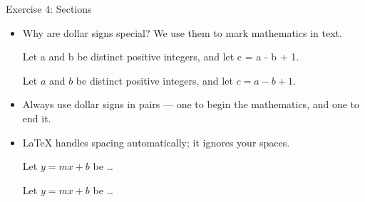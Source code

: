 \documentclass[10pt,times]{beamer}
\begin{document}
\begin{frame}[fragile]{Exercise 4: Sections}
\begin{itemize}
\item Why are dollar signs \keys{\$} special? We use them to mark mathematics 
in text.\\[1ex]
\begin{exampletwouptiny}
Let a and b be distinct positive
integers, and let c = a - b + 1.

Let $a$ and $b$ be distinct positive
integers, and let $c = a - b + 1$.
\end{exampletwouptiny}
\item Always use dollar signs in pairs --- one to begin the mathematics, and one
to end it.
\item \LaTeX{} handles spacing automatically; it ignores your spaces.
\begin{exampletwouptiny}
Let $y=mx+b$ be \ldots

Let $y = m x + b$ be \ldots
\end{exampletwouptiny}

\end{itemize}
\end{frame}
\end{document}
